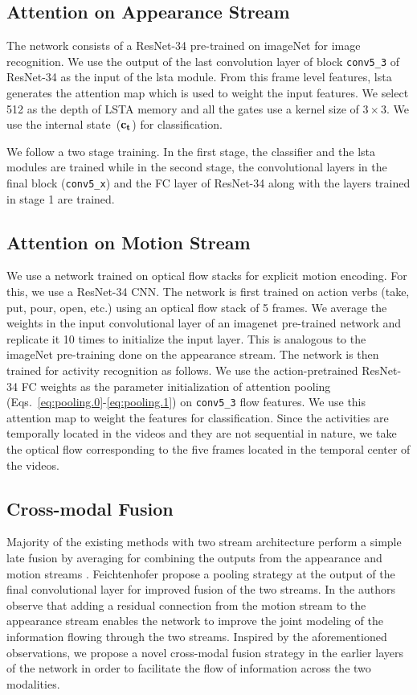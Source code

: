 \documentclass[10pt,twocolumn,letterpaper]{article}
\newcommand{\io}[1]{{\bf #1}}
\begin{document}
\subsection{Attention on Appearance Stream}
\label{sec:app_stream}
	The network consists of a ResNet-34 pre-trained on imageNet for image recognition. We use the output of the last convolution layer of block \verb+conv5_3+ of ResNet-34 as the input of the \ac{lsta} module. From this frame level features, \ac{lsta} generates the attention map which is used to weight the input features. We select 512 as the depth of LSTA memory and all the gates use a kernel size of $3\times 3$. We use the internal state~($\io{c_t}$) for classification.
	
	We follow a two stage training. In the first stage, the classifier and the \ac{lsta} modules are trained while in the second stage, the convolutional layers in the final block (\verb+conv5_x+) and the FC layer of ResNet-34 along with the layers trained in stage 1 are trained. 
	
\subsection{Attention on Motion Stream}
\label{sec:motion_stream}
	We use a network trained on optical flow stacks for explicit motion encoding. For this, we use a ResNet-34 CNN. The network is first trained on action verbs (take, put, pour, open, etc.) using an optical flow stack of 5 frames. We average the weights in the input convolutional layer of an imagenet pre-trained network and replicate it 10 times to initialize the input layer. This is analogous to the imageNet pre-training done on the appearance stream. The network is then trained for activity recognition as follows. We use the action-pretrained ResNet-34 FC weights as the parameter initialization of attention pooling (Eqs.~\ref{eq:pooling.0}-\ref{eq:pooling.1}) on \verb+conv5_3+ flow features. We use this attention map to weight the features for classification. Since the activities are temporally located in the videos and they are not sequential in nature, we take the optical flow corresponding to the five frames located in the temporal center of the videos.
\subsection{Cross-modal Fusion}
\label{sec:twostream.cross}
    Majority of the existing methods with two stream architecture perform a simple late fusion by averaging for combining the outputs from the appearance and motion streams \cite{simonyan2014two, TSN2016ECCV}. Feichtenhofer \etal \cite{feichtenhofer2016convolutional} propose a pooling strategy at the output of the final convolutional layer for improved fusion of the two streams. In \cite{feichtenhofer2016spatiotemporal} the authors observe that adding a residual connection from the motion stream to the appearance stream enables the network to improve the joint modeling of the information flowing through the two streams. Inspired by the aforementioned observations, we propose a novel cross-modal fusion strategy in the earlier layers of the network in order to facilitate the flow of information across the two modalities. 
\end{document}
